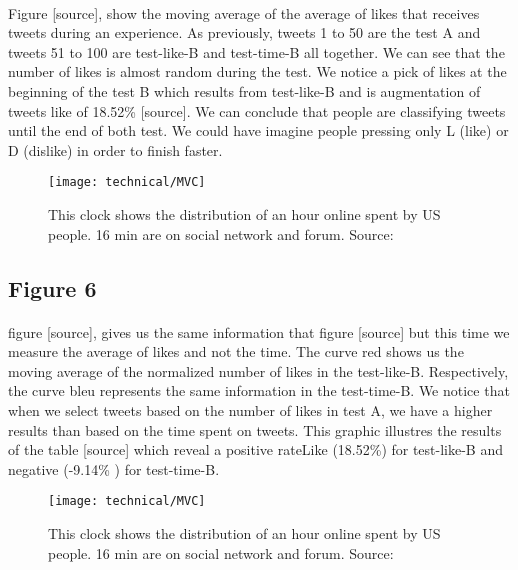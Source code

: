 \paragraph{}
Figure [source], show the moving average of the average of likes that receives tweets during an experience. As previously, tweets 1 to 50 are the test A and tweets 51 to 100 are test-like-B and test-time-B all together.
We can see that the number of likes is almost random during the test. We notice a pick of likes at the beginning of the test B which results from test-like-B and is augmentation of tweets like of 18.52\% [source].
We can conclude that people are classifying tweets until the end of both test. We could have imagine people pressing only L (like) or D (dislike) in order to finish faster.

\begin{figure}[h] 
\centering 
\texttt{[image: technical/MVC]} 
\caption[Time spent of Social Media]{This clock shows the distribution of an hour online spent by US people. 16 min are on social network and forum. Source: \cite{s_clock}}
\label{fig:tinder} 
\end{figure}

\subsection{Figure 6}

\paragraph{}
figure [source], gives us the same information that figure [source] but this time we measure the average of likes and not the time. The curve red shows us the moving average of the normalized number of likes in the test-like-B. Respectively, the curve bleu represents the same information in the test-time-B.
We notice that when we select tweets based on the number of likes in test A, we have a higher results than based on the time spent on tweets. This graphic illustres the results of the table [source] which reveal a positive rateLike (18.52\%) for test-like-B and negative (-9.14\% ) for test-time-B.

\begin{figure}[h] 
\centering 
\texttt{[image: technical/MVC]} 
\caption[Time spent of Social Media]{This clock shows the distribution of an hour online spent by US people. 16 min are on social network and forum. Source: \cite{s_clock}}
\label{fig:tinder} 
\end{figure}

